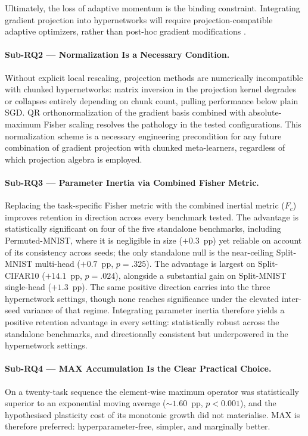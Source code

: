 Ultimately, the loss of adaptive momentum is
the binding constraint.
Integrating gradient projection into hypernetworks
will require projection-compatible adaptive optimizers,
rather than post-hoc gradient modifications \citep{hu_hidden_2026}.

\paragraph{Sub-RQ2 --- Normalization Is a Necessary Condition.}
Without explicit local rescaling, projection methods are numerically
incompatible with chunked hypernetworks: matrix inversion in the
projection kernel degrades or collapses entirely depending on chunk
count, pulling performance below plain SGD.
QR orthonormalization of the gradient basis combined with
absolute-maximum Fisher scaling resolves the pathology in the tested
configurations.
This normalization scheme is a necessary engineering precondition for
any future combination of gradient projection with chunked
meta-learners, regardless of which projection algebra is employed.

\paragraph{Sub-RQ3 --- Parameter Inertia via Combined Fisher Metric.}
Replacing the task-specific Fisher metric with the combined inertial metric
($F_c$) improves retention in direction across every benchmark tested.
The advantage is statistically significant on four of the five standalone
benchmarks, including Permuted-MNIST, where it is negligible in size
($+0.3$~pp) yet reliable on account of its consistency across seeds; the only
standalone null is the near-ceiling Split-MNIST multi-head ($+0.7$~pp,
$p = .325$). The advantage is largest on Split-CIFAR10 ($+14.1$~pp,
$p = .024$), alongside a substantial gain on Split-MNIST single-head ($+1.3$~pp). 
The same positive direction carries into the three hypernetwork
settings, though none reaches significance under the elevated inter-seed
variance of that regime. Integrating parameter inertia therefore yields a
positive retention advantage in every setting: statistically robust across the
standalone benchmarks, and directionally consistent but underpowered in the
hypernetwork settings.

\paragraph{Sub-RQ4 --- MAX Accumulation Is the Clear Practical Choice.}
On a twenty-task sequence the element-wise maximum operator was statistically
superior to an exponential moving average (${\sim}1.60$~pp, $p < 0.001$),
and the hypothesised plasticity cost of its monotonic growth did not
materialise. MAX is therefore preferred: hyperparameter-free, simpler, and
marginally better.

